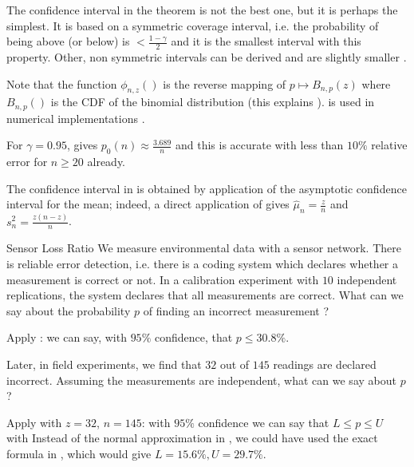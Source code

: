 The confidence interval in the theorem is not the best one, but
it is perhaps the simplest. It is based on a symmetric coverage
interval, i.e. the probability of being above (or below) is
$<\frac{1-\gamma}{2}$ and it is the smallest interval with this
property. Other, non symmetric intervals can be derived and are
slightly smaller \cite{blyth1983binomial}.

Note that the function $\phi_{n,z}()$   is the reverse mapping
of $p \mapsto B_{n,p}(z)$ where $B_{n,p}()$ is the CDF of the
binomial distribution (this explains ).
 is used in numerical implementations
\cite{johnson2005univariate}.

For $\gamma = 0.95$,  gives $p_0(n) \approx
  \frac{3.689}{n}$ and this is accurate with less than $10\%$
  relative error for $n \geq 20$ already.

The confidence interval in  is obtained
by application of the asymptotic confidence interval for the
mean; indeed, a direct application of 
gives $\hat{\mu}_n=\frac{z}{n}$ and $s^2_n=\frac{z (n-z)}{n}$.

\begin{exnn}{Sensor Loss Ratio}
We measure environmental data with a sensor network. There is
reliable error detection, i.e. there is a coding system which
declares whether a measurement is correct or not. In a
calibration experiment with $10$ independent replications, the
system declares that all measurements are correct. What can we
say about the probability $p$ of finding an incorrect
measurement ?

Apply : we can say, with $95\%$ confidence,
that $p\leq 30.8\%$.

Later, in field experiments, we find that $32$ out of $145$
readings are declared incorrect. Assuming the measurements are
independent, what can we say about $p$ ?

Apply  with $z=32$, $n=145$: with
$95\%$ confidence we can say that $L \leq p \leq U$ with
 \ben
 \een
Instead of the normal approximation in
, we could have used the exact formula
in , which would give $L=  15.6\%, U= 29.7\%$.
\end{exnn}

